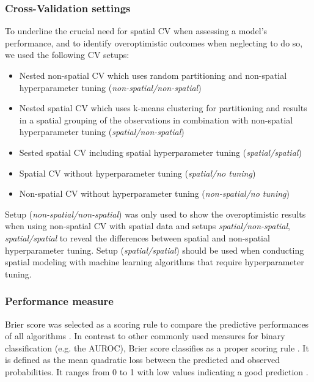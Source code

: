 \documentclass[review]{elsarticle}
\begin{document}
\subsubsection{Cross-Validation settings}

To underline the crucial need for spatial \ac{CV} when assessing a model's performance, and to identify overoptimistic outcomes when neglecting to do so, we used the following CV setups:

\begin{itemize}
	\item Nested non-spatial \ac{CV} which uses random partitioning and non-spatial hyperparameter tuning (\emph{non-spatial/non-spatial})
	\item Nested spatial \ac{CV} which uses k-means clustering for partitioning \citep{Brenning2005} and results in a spatial grouping of the observations in combination with non-spatial hyperparameter tuning (\emph{spatial/non-spatial})
	\item Sested spatial \ac{CV} including spatial hyperparameter tuning (\emph{spatial/spatial})
	\item Spatial \ac{CV} without hyperparameter tuning (\emph{spatial/no tuning})
	\item Non-spatial \ac{CV} without hyperparameter tuning (\emph{non-spatial/no tuning})
\end{itemize}

\noindent Setup (\emph{non-spatial/non-spatial}) was only used to show the overoptimistic results when using non-spatial \ac{CV} with spatial data and setups \emph{spatial/non-spatial}, \emph{spatial/spatial} to reveal the differences between spatial and non-spatial hyperparameter tuning.
Setup (\emph{spatial/spatial}) should be used when conducting spatial modeling with machine learning algorithms that require hyperparameter tuning.

\subsubsection{Performance measure}
Brier score was selected as a scoring rule to compare the predictive performances of all algorithms \citep{Brier1950}.
In contrast to other commonly used measures for binary classification (e.g. the \ac{AUROC}), Brier score classifies as a proper scoring rule \citep{Byrne2016, Gneiting2007}.
It is defined as the mean quadratic loss between the predicted and observed probabilities.
It ranges from 0 to 1 with low values indicating a good prediction \citep{Brier1950}.
\end{document}
